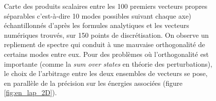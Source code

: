 \documentclass[svgnames,dvipsnames,a4paper,10pt,french]{report}
\begin{document}
\begin{figure}[H]
    \centering
    \qquad
    \caption[Mesure de l'orthogonalité des modes analytiques et numériques]{Carte des produits scalaires entre les 100 premiers vecteurs propres séparables c'est-à-dire 10 modes possibles suivant chaque axe) échantillonnés d'après les formules analytiques et les vecteurs numériques trouvés, sur 150 points de discrétisation. On observe un repliement de spectre qui conduit à une mauvaise orthogonalité de certains modes entre eux. Pour des problèmes où l'orthogonalité est importante (comme la \textit{sum over states} en théorie des perturbations), le choix de l'arbitrage entre les deux ensembles de vecteurs se pose, en parallèle de la précision sur les énergies associées (figure \ref{fig:en_lap_2D}).}%
    \label{fig:damier}%
\end{figure}
\end{document}
